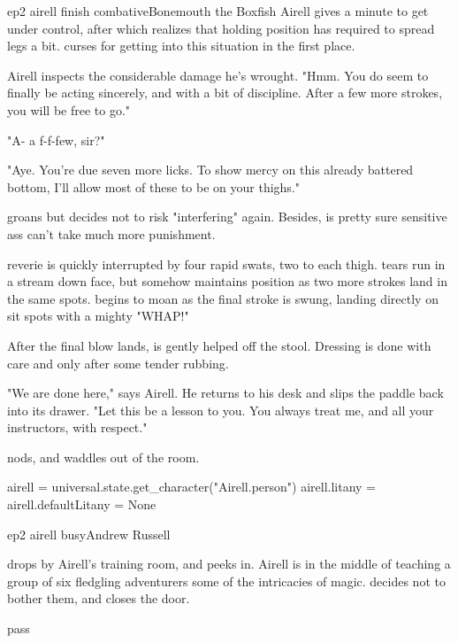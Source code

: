 \documentclass{book}
\begin{document}
\begin{childnode}{ep2 airell finish combative}{Bonemouth the Boxfish}
Airell gives \name{} a minute to get \himselfherself{} under control, after which \name{} realizes that holding \hisher{} position has required \himher{} to spread \hisher{} legs a bit. \HeShe{} 
curses \himselfherself{} for getting into this situation in the first place.

Airell inspects the considerable damage he's wrought. "Hmm. You do seem to finally be acting sincerely, and with a bit of discipline. After a few more strokes, you will be free to go."

"A- a f-f-few, sir?" 

"Aye. You're due seven more licks. To show mercy on this already battered bottom, I'll allow most of these to be on your thighs."

\name{} groans but decides not to risk "interfering" again. Besides, \heshe{} is pretty sure \hisher{} sensitive ass can't take much more punishment.

\HisHer{} reverie is quickly interrupted by four rapid swats, two to each thigh. \names{} tears run in a stream down \hisher{} face, but \heshe{} somehow maintains \hisher{} position as two more 
strokes land in the same spots. \HeShe{} begins to moan as the final stroke is swung, landing directly on \hisher{} sit spots with a mighty "WHAP!"

After the final blow lands, \name{} is gently helped off the stool. Dressing is done with care and only after some tender rubbing. 

"We are done here," says Airell. He returns to his desk and slips the paddle back into its drawer. "Let this be a lesson to you. You always treat me, and all your instructors, with respect."

\name{} nods, and waddles out of the room.


\begin{code}

    airell = universal.state.get_character("Airell.person")
    airell.litany = airell.defaultLitany = None

\end{code}

\end{childnode}

\begin{childnode}{ep2 airell busy}{Andrew Russell}

    \name{} drops by Airell's training room, and peeks in. Airell is in the middle of teaching a group of six fledgling adventurers some of the intricacies of magic. \name{} decides not to bother
    them, and closes the door.

\end{childnode}

\begin{closeScene}
        pass
\end{closeScene}
\end{document}
